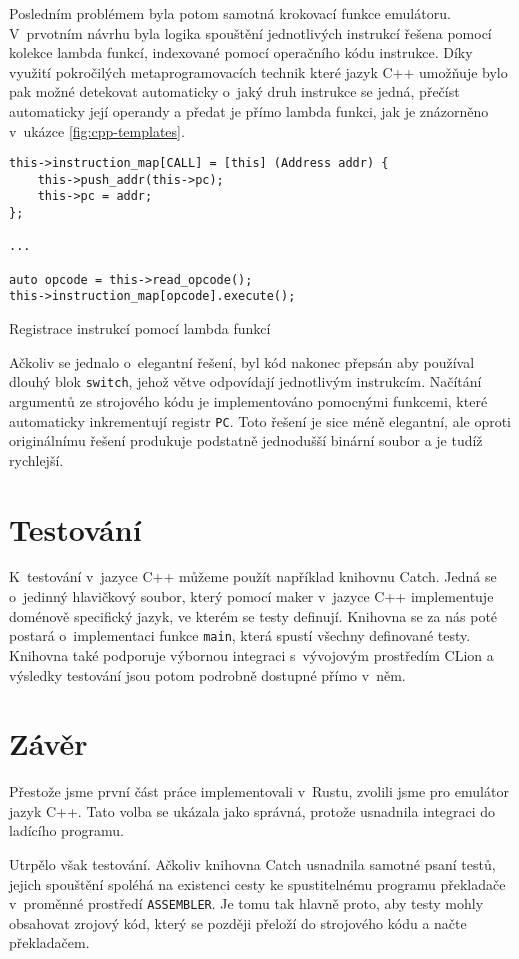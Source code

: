 Posledním problémem byla potom samotná krokovací funkce emulátoru. V~prvotním návrhu byla logika spouštění jednotlivých instrukcí řešena pomocí kolekce lambda funkcí, indexované pomocí operačního kódu instrukce. Díky využití pokročilých metaprogramovacích technik které jazyk C++ umožňuje bylo pak možné detekovat automaticky o~jaký druh instrukce se jedná, přečíst automaticky její operandy a předat je přímo lambda funkci, jak je znázorněno v~ukázce \ref{fig:cpp-templates}.

\begin{listing}[htbp]
\begin{verbatim}
this->instruction_map[CALL] = [this] (Address addr) {
	this->push_addr(this->pc);
	this->pc = addr;
};

...

auto opcode = this->read_opcode();
this->instruction_map[opcode].execute();
\end{verbatim}
\caption{Registrace instrukcí pomocí lambda funkcí}
\label{fig:cpp-templates}
\end{listing}

Ačkoliv se jednalo o~elegantní řešení, byl kód nakonec přepsán aby používal dlouhý blok \texttt{switch}, jehož větve odpovídají jednotlivým instrukcím. Načítání argumentů ze strojového kódu je implementováno pomocnými funkcemi, které automaticky inkrementují registr \texttt{PC}. Toto řešení je sice méně elegantní, ale oproti originálnímu řešení produkuje podstatně jednodušší binární soubor a je tudíž rychlejší.

\section{Testování}
\label{sec:emu-test}

K~testování v~jazyce C++ můžeme použít například knihovnu Catch\cite{github-catch}. Jedná se o~jedinný hlavičkový soubor, který pomocí maker v~jazyce C++ implementuje doménově specifický jazyk, ve kterém se testy definují. Knihovna se za nás poté postará o~implementaci funkce \texttt{main}, která spustí všechny definované testy. Knihovna také podporuje výbornou integraci s~vývojovým prostředím CLion\cite{clion-catch} a výsledky testování jsou potom podrobně dostupné přímo v~něm.

\section{Závěr}

Přestože jsme první část práce implementovali v~Rustu, zvolili jsme pro e\-mu\-lá\-tor jazyk C++. Tato volba se ukázala jako správná, protože usnadnila integraci do ladícího programu.

Utrpělo však testování. Ačkoliv knihovna Catch usnadnila samotné psaní testů, jejich spouštění spoléhá na existenci cesty ke spustitelnému programu překladače v~proměnné prostředí \texttt{ASSEMBLER}. Je tomu tak hlavně proto, aby testy mohly obsahovat zrojový kód, který se později přeloží do strojového kódu a načte překladačem.